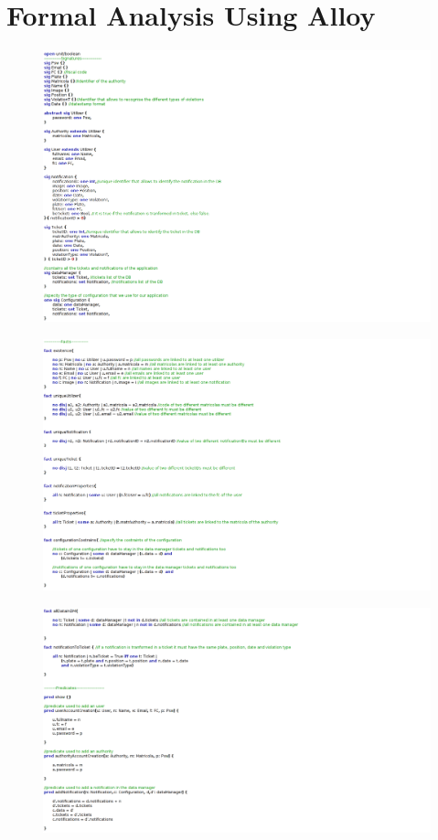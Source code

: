 \documentclass {article}
\begin{document}
\section{Formal Analysis Using Alloy}
\begin{figure}[H]
			\centering
			\includegraphics[scale=0.50]{Images/Alloy/Signatures.png}
		\end{figure}
\begin{figure}[H]
			\centering
			\includegraphics[scale=0.50]{Images/Alloy/Fact1.png}
		\end{figure}
		\begin{figure}[H]
			\centering
			\includegraphics[scale=0.50]{Images/Alloy/Fact2_Pred1.png}
		\end{figure}
\end{document}
